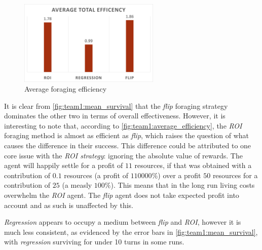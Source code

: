 \begin{figure}[H] 
\centering
\includegraphics[width=0.6\textwidth]{09_team1_agentdesign/images/total_efficiency}
\caption{Average foraging efficiency}
\label{fig:team1:average_efficiency}
\end{figure} 

It is clear from \autoref{fig:team1:mean_survival} that the \emph{flip} foraging strategy dominates the other two in terms of overall effectiveness. However, it is interesting to note that, according to \autoref{fig:team1:average_efficiency}, the \emph{ROI} foraging method is almost as efficient as \emph{flip}, which raises the question of what causes the difference in their success. This difference could be attributed to one core issue with the \emph{ROI strategy}: ignoring the absolute value of rewards. The agent will happily settle for a profit of $11$ resources, if that was obtained with a contribution of $0.1$ resources (a profit of $110000\%$) over a profit $50$ resources for a contribution of $25$ (a measly $100\%$). This means that in the long run living costs overwhelm the \emph{ROI} agent. The \emph{flip} agent does not take expected profit into account and as such is unaffected by this.

\emph{Regression} appears to occupy a medium between \emph{flip} and \emph{ROI}, however it is much less consistent, as evidenced by the error bars in \autoref{fig:team1:mean_survival}, with \emph{regression} surviving for under 10 turns in some runs.


